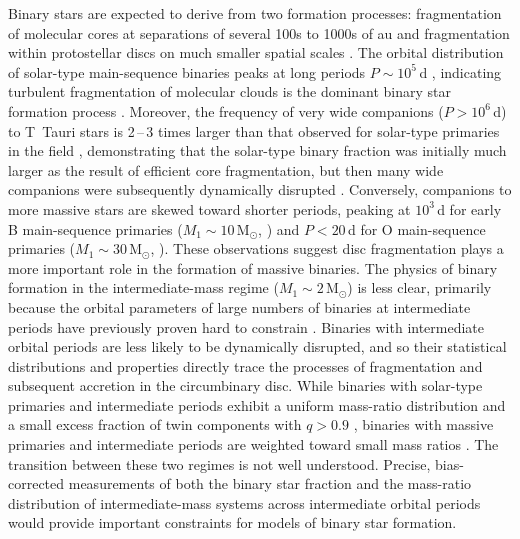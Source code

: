 \documentclass[a4paper,fleqn,usenatbib]{mnras}
\begin{document}
Binary stars are expected to derive from two formation processes: fragmentation of molecular cores at separations of several 100s to 1000s of au and fragmentation within protostellar discs on much smaller spatial scales \citep{tohline2002,bate2009,kratter2011,tobinetal2016}.
The orbital distribution of solar-type main-sequence binaries peaks at long periods $P \sim 10^5$\,d \citep{duquennoy&mayor1991,raghavanetal2010}, indicating turbulent fragmentation of molecular clouds is the dominant binary star formation process \citep{offneretal2010}. Moreover, the frequency of very wide companions ($P > 10^6$\,d) to T~Tauri stars is 2\,--\,3 times larger than that observed for solar-type primaries in the field \citep{ghezetal1993,ducheneetal2007,connelleyetal2008b,tobinetal2016},
demonstrating that the solar-type binary fraction was initially much larger as the result of efficient core fragmentation, but then many wide companions were subsequently dynamically disrupted \citep{goodwin&kroupa2005,marks&kroupa2012,thiesetal2015}.
Conversely, companions to more massive stars are skewed toward shorter periods, peaking at $10^3$\,d for early B main-sequence primaries ($M_1 \sim 10$\,M$_{\odot}$, \citealt{abtetal1990,rizzutoetal2013,moe&distefano2017}) and $P<20$\,d for O main-sequence primaries ($M_1 \sim 30$\,M$_{\odot}$, \citealt{sanaetal2012a}).
These observations suggest disc fragmentation plays a more important role in the formation of massive binaries. The physics of binary formation in the intermediate-mass regime ($M_1 \sim 2$\,M$_{\odot}$) is less clear, primarily because the orbital parameters of large numbers of binaries at intermediate periods have previously proven hard to constrain \citep{fuhrmann&chini2012}.  Binaries with intermediate orbital periods are less likely to be dynamically disrupted, and so their statistical distributions and properties directly trace the processes of fragmentation and subsequent accretion in the circumbinary disc.  While binaries with solar-type primaries and intermediate periods exhibit a uniform mass-ratio distribution and a small excess fraction of twin components with $q > 0.9$ \citep{halbwachsetal2003,raghavanetal2010}, binaries with massive primaries and intermediate periods are weighted toward small mass ratios \citep{abtetal1990,rizzutoetal2013,gulliksonetal2016,moe&distefano2017}.  The transition between these two regimes is not well understood.  Precise, bias-corrected measurements of both the binary star fraction and the mass-ratio distribution of intermediate-mass systems across intermediate orbital periods would provide important constraints for models of binary star formation.
\end{document}
